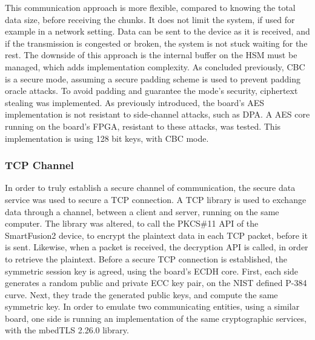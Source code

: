 This communication approach is more flexible, compared to knowing the total data size, before receiving the chunks. It does not limit the system, if used for example in a network setting. Data can be sent to the device as it is received, and if the transmission is congested or broken, the system is not stuck waiting for the rest. The downside of this approach is the internal buffer on the HSM must be managed, which adds implementation complexity.
As concluded previously, CBC is a secure mode, assuming a secure padding scheme is used to prevent padding oracle attacks. To avoid padding and guarantee the mode's security, ciphertext stealing was implemented.
As previously introduced, the board's AES implementation is not resistant to side-channel attacks, such as DPA. A AES core running on the board's FPGA, resistant to these attacks, was tested. This implementation is using 128 bit keys, with CBC mode.

\subsubsection{TCP Channel}\label{chap:implementation:services:secure:tcp}

In order to truly establish a secure channel of communication, the secure data service was used to secure a TCP connection. A TCP library \cite{picoTCP} is used to exchange data through a channel, between a client and server, running on the same computer. The library was altered, to call the PKCS\#11 API of the SmartFusion2 device, to encrypt the plaintext data in each TCP packet, before it is sent. Likewise, when a packet is received, the decryption API is called, in order to retrieve the plaintext.
Before a secure TCP connection is established, the symmetric session key is agreed, using the board's ECDH core. First, each side generates a random public and private ECC key pair, on the NIST defined P-384 curve. Next, they trade the generated public keys, and compute the same symmetric key. In order to emulate two communicating entities, using a similar board, one side is running an implementation of the same cryptographic services, with the mbedTLS 2.26.0 library.



